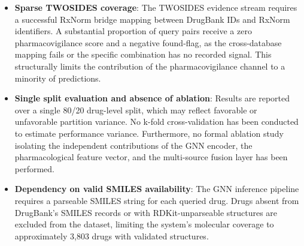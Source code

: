 \documentclass[conference]{IEEEtran}
\begin{document}
\begin{itemize}
    \item \textbf{Sparse TWOSIDES coverage}: The TWOSIDES evidence stream requires a successful RxNorm bridge mapping between DrugBank IDs and RxNorm identifiers. A substantial proportion of query pairs receive a zero pharmacovigilance score and a negative found-flag, as the cross-database mapping fails or the specific combination has no recorded signal. This structurally limits the contribution of the pharmacovigilance channel to a minority of predictions.

    \item \textbf{Single split evaluation and absence of ablation}: Results are reported over a single 80/20 drug-level split, which may reflect favorable or unfavorable partition variance. No k-fold cross-validation has been conducted to estimate performance variance. Furthermore, no formal ablation study isolating the independent contributions of the GNN encoder, the pharmacological feature vector, and the multi-source fusion layer has been performed.

    \item \textbf{Dependency on valid SMILES availability}: The GNN inference pipeline requires a parseable SMILES string for each queried drug. Drugs absent from DrugBank's SMILES records or with RDKit-unparseable structures are excluded from the dataset, limiting the system's molecular coverage to approximately 3,803 drugs with validated structures.
\end{itemize}
\end{document}

